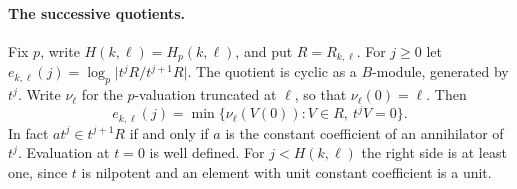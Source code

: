 \documentclass[11pt,letterpaper]{article}
\newcommand{\card}[1]{\lvert #1\rvert}
\begin{document}
\paragraph{The successive quotients.}
Fix $p$, write $H(k,\ell)=H_p(k,\ell)$, and put $R=R_{k,\ell}$. For $j\ge0$
let $e_{k,\ell}(j)=\log_p\card{t^jR/t^{j+1}R}$. The quotient is cyclic
as a $B$-module, generated by $t^j$. Write $\nu_\ell$ for the $p$-valuation
truncated at $\ell$, so that $\nu_\ell(0)=\ell$. Then
\begin{equation}\label{ann}
 e_{k,\ell}(j)=\min\{\nu_\ell(V(0)): V\in R,\ t^jV=0\}.
\end{equation}
In fact $at^j\in t^{j+1}R$ if and only if $a$ is the constant coefficient
of an annihilator of $t^j$. Evaluation at $t=0$ is well defined. For
$j<H(k,\ell)$ the right side is at least one, since $t$ is nilpotent and
an element with unit constant coefficient is a unit.
\end{document}

